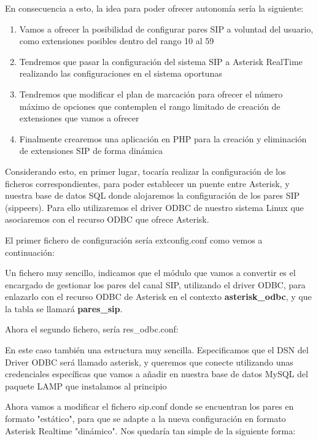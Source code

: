 {En consecuencia a esto, la idea para poder ofrecer autonomía sería la siguiente:

\begin{enumerate}

\item {Vamos a ofrecer la posibilidad de configurar pares SIP a voluntad del usuario, como extensiones posibles dentro del rango 10 al 59}
\item {Tendremos que pasar la configuración del sistema SIP a Asterisk RealTime realizando las configuraciones en el sistema oportunas}
\item {Tendremos que modificar el plan de marcación para ofrecer el número máximo de opciones que contemplen el rango limitado de creación de extensiones que vamos a ofrecer}
\item {Finalmente crearemos una aplicación en PHP para la creación y eliminación de extensiones SIP de forma dinámica}

\end{enumerate}

Considerando esto, en primer lugar, tocaría realizar la configuración de los ficheros correspondientes, para poder establecer un puente entre Asterisk, y nuestra base de datos SQL donde alojaremos la configuración de los pares SIP (sippeers). Para ello utilizaremos el driver ODBC de nuestro sistema Linux que asociaremos con el recurso ODBC que ofrece Asterisk.

El primer fichero de configuración sería extconfig.conf como vemos a continuación:



Un fichero muy sencillo, indicamos que el módulo que vamos a convertir es el encargado de gestionar los pares del canal SIP, utilizando el driver ODBC, para enlazarlo con el recurso ODBC de Asterisk en el contexto \textbf{asterisk\_odbc}, y que la tabla se llamará \textbf{pares\_sip}.

Ahora el segundo fichero, sería res\_odbc.conf:



En este caso también una estructura muy sencilla. Especificamos que el DSN del Driver ODBC será llamado asterisk, y queremos que conecte utilizando unas credenciales específicas que vamos a añadir en nuestra base de datos MySQL del paquete LAMP que instalamos al principio

Ahora vamos a modificar el fichero sip.conf donde se encuentran los pares en formato "estático", para que se adapte a la nueva configuración en formato Asterisk Realtime "dinámico". Nos quedaría tan simple de la siguiente forma:

}
